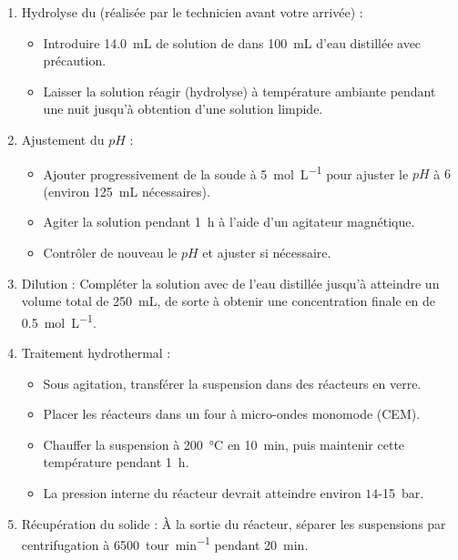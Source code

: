 \documentclass[twoside,a4paper,11pt,addpoints]{exam}%
\begin{document}
\begin{enumerate}
\item Hydrolyse du  (réalisée par le technicien avant votre arrivée) :
\begin{itemize}
   \item Introduire \SI{14,0}{\milli\liter} de solution de  dans \SI{100}{\milli\liter} d'eau distillée avec précaution.  
   \item Laisser la solution réagir (hydrolyse) à température ambiante pendant une nuit jusqu'à obtention d'une solution limpide.  
\end{itemize}

\item Ajustement du $pH$ :
\begin{itemize}
   \item Ajouter progressivement de la soude à \SI{5}{\mole\per\liter} pour ajuster le $pH$ à $6$ (environ \SI{125}{\milli\liter} nécessaires).  
   \item Agiter la solution pendant \SI{1}{\hour} à l'aide d'un agitateur magnétique.  
   \item Contrôler de nouveau le $pH$ et ajuster si nécessaire. 
\end{itemize}
 

\item Dilution : Compléter la solution avec de l'eau distillée jusqu'à atteindre un volume total de \SI{250}{\milli\liter}, de sorte à obtenir une concentration finale en  de \SI{0.5}{\mole\per\liter}.  

\item Traitement hydrothermal :
\begin{itemize}
   \item Sous agitation, transférer la suspension dans des réacteurs en verre.%
   \item Placer les réacteurs dans un four à micro-ondes monomode (CEM).
   \item Chauffer la suspension à \SI{200}{\celsius} en \SI{10}{\minute}, puis maintenir cette température pendant \SI{1}{\hour}.  
   \item La pression interne du réacteur devrait atteindre environ $14$-\SI{15}{\bar}.  
\end{itemize}

\item Récupération du solide  : \`{A} la sortie du réacteur, séparer les suspensions par centrifugation à \SI{6500}{{tour}\per\minute} pendant \SI{20}{\minute}.%


\end{enumerate}
\end{document}
